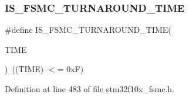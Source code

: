 \subsubsection{\texorpdfstring{I\+S\+\_\+\+F\+S\+M\+C\+\_\+\+T\+U\+R\+N\+A\+R\+O\+U\+N\+D\+\_\+\+T\+I\+ME}{IS\_FSMC\_TURNAROUND\_TIME}}
{\footnotesize\ttfamily \#define I\+S\+\_\+\+F\+S\+M\+C\+\_\+\+T\+U\+R\+N\+A\+R\+O\+U\+N\+D\+\_\+\+T\+I\+ME(\begin{DoxyParamCaption}\item[{}]{T\+I\+ME }\end{DoxyParamCaption})~((T\+I\+ME) $<$= 0x\+F)}



Definition at line 483 of file stm32f10x\+\_\+fsmc.\+h.

